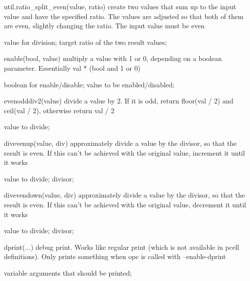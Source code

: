 \begin{APIfunc}{util.ratio\_split\_even(value, ratio)}
    create two values that sum up to the input value and have the specified ratio. The values are adjusted so that both of them are even, slightly changing the ratio. The input value must be even
    \begin{APIparameters}
            value for division;
            target ratio of the two result values;
    \end{APIparameters}
\end{APIfunc}
\begin{APIfunc}{enable(bool, value)}
    multiply a value with 1 or 0, depending on a boolean parameter. Essentially val * (bool and 1 or 0)
    \begin{APIparameters}
            boolean for enable/disable;
            value to be enabled/disabled;
    \end{APIparameters}
\end{APIfunc}
\begin{APIfunc}{evenodddiv2(value)}
    divide a value by 2. If it is odd, return floor(val / 2) and ceil(val / 2), otherwise return val / 2
    \begin{APIparameters}
            value to divide;
    \end{APIparameters}
\end{APIfunc}
\begin{APIfunc}{divevenup(value, div)}
    approximately divide a value by the divisor, so that the result is even. If this can't be achieved with the original value, increment it until it works
    \begin{APIparameters}
            value to divide;
            divisor;
    \end{APIparameters}
\end{APIfunc}
\begin{APIfunc}{divevendown(value, div)}
    approximately divide a value by the divisor, so that the result is even. If this can't be achieved with the original value, decrement it until it works
    \begin{APIparameters}
            value to divide;
            divisor;
    \end{APIparameters}
\end{APIfunc}
\begin{APIfunc}{dprint(...)}
    debug print. Works like regular print (which is not available in pcell definitions). Only prints something when opc is called with --enable-dprint
    \begin{APIparameters}
            variable arguments that should be printed;
    \end{APIparameters}
\end{APIfunc}

